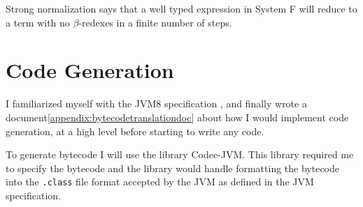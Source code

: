 \documentclass[float=false, crop=false]{standalone}
\begin{document}
\begin{displayquote} Strong normalization says that a well typed expression in System F will
reduce to a term with no $\beta$-redexes in a finite number of steps.
\end{displayquote}

\section{Code Generation}

I familiarized myself with the JVM8 specification \cite{jvm-spec8}, and finally wrote a 
document\ref{appendix:bytecodetranslationdoc} about how I would implement code generation, 
at a high level before starting to write any code.

To generate bytecode I will use the library Codec-JVM\cite{codec-jvm-link}. This library 
required me to specify the bytecode and the library would handle formatting the bytecode into
the \texttt{.class} file format accepted by the JVM as defined in the JVM specification. 
\end{document}

